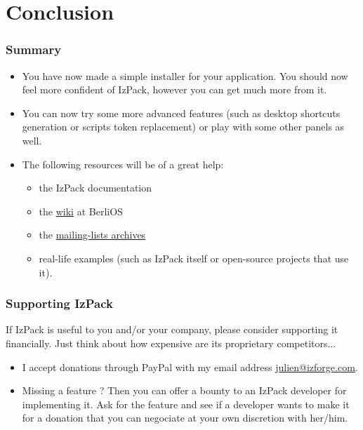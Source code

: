 \documentclass{beamer}
\begin{document}

\section{Conclusion}

\begin{frame}

\frametitle{Summary}

\begin{itemize}

  \item You have now made a simple installer for your application. You should
  now feel more confident of IzPack, however you can get much more from it.

  \item You can now try some more advanced features (such as desktop shortcuts
  generation or scripts token replacement) or play with some other panels as
  well.

  \item The following resources will be of a great help:
  \begin{itemize}

    \item the IzPack documentation

    \item the \href{http://openfacts.berlios.de/index-en.phtml?title=IzPack}{
    wiki} at BerliOS

    \item the \href{http://developer.berlios.de/mail/?group_id=1408}{
    mailing-lists archives}

    \item real-life examples (such as IzPack itself or open-source projects that
    use it).

  \end{itemize}

\end{itemize}

\end{frame}

\begin{frame}

\frametitle{Supporting IzPack}

If IzPack is useful to you and/or your company, please consider supporting it
financially. Just think about how expensive are its proprietary competitors...

\begin{itemize}

  \item I accept donations through PayPal with my email address
  \url{julien@izforge.com}.

  \item Missing a feature ? Then you can offer a bounty to an IzPack developer
  for implementing it. Ask for the feature and see if a developer wants to make
  it for a donation that you can negociate at your own discretion with her/him.

\end{itemize}

\end{frame}

\end{document}
